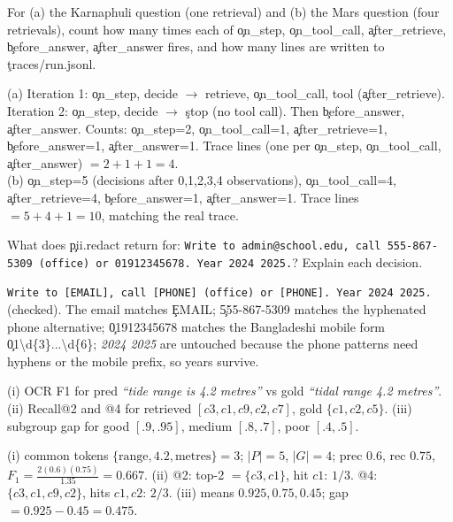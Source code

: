 \begin{problem}
For (a) the Karnaphuli question (one retrieval) and (b) the Mars question (four retrievals), count how many times each of \c{on\_step}, \c{on\_tool\_call}, \c{after\_retrieve}, \c{before\_answer}, \c{after\_answer} fires, and how many lines are written to \c{traces/run.jsonl}.
\end{problem}
\begin{solution}
(a) Iteration 1: \c{on\_step}, decide $\to$ retrieve, \c{on\_tool\_call}, tool (\c{after\_retrieve}). Iteration 2: \c{on\_step}, decide $\to$ \c{stop} (no tool call). Then \c{before\_answer}, \c{after\_answer}. Counts: \c{on\_step}=2, \c{on\_tool\_call}=1, \c{after\_retrieve}=1, \c{before\_answer}=1, \c{after\_answer}=1. Trace lines (one per \c{on\_step}, \c{on\_tool\_call}, \c{after\_answer}) $=2+1+1=4$.\\
(b) \c{on\_step}=5 (decisions after 0,1,2,3,4 observations), \c{on\_tool\_call}=4, \c{after\_retrieve}=4, \c{before\_answer}=1, \c{after\_answer}=1. Trace lines $=5+4+1=10$, matching the real trace.
\end{solution}

\begin{problem}[PII]
What does \c{pii.redact} return for: \texttt{Write to admin@school.edu, call 555-867-5309 (office) or 01912345678. Year 2024 2025.}? Explain each decision.
\end{problem}
\begin{solution}
\texttt{Write to [EMAIL], call [PHONE] (office) or [PHONE]. Year 2024 2025.} (checked). The email matches \c{EMAIL}; \c{555-867-5309} matches the hyphenated phone alternative; \c{01912345678} matches the Bangladeshi mobile form \c{01\textbackslash d\{3\}...\textbackslash d\{6\}}; \emph{2024 2025} are untouched because the phone patterns need hyphens or the mobile prefix, so years survive.
\end{solution}

\begin{problem}[Metrics]
(i) OCR F1 for pred \emph{``tide range is 4.2 metres''} vs gold \emph{``tidal range 4.2 metres''}. (ii) Recall@2 and @4 for retrieved $[c3,c1,c9,c2,c7]$, gold $\{c1,c2,c5\}$. (iii) subgroup gap for good $[.9,.95]$, medium $[.8,.7]$, poor $[.4,.5]$.
\end{problem}
\begin{solution}
(i) common tokens $\{\text{range},4.2,\text{metres}\}=3$; $|P|=5$, $|G|=4$; prec $0.6$, rec $0.75$, $F_1=\frac{2(0.6)(0.75)}{1.35}=0.667$. (ii) @2: top-2 $=\{c3,c1\}$, hit $c1$: $1/3$. @4: $\{c3,c1,c9,c2\}$, hits $c1,c2$: $2/3$. (iii) means $0.925,0.75,0.45$; gap $=0.925-0.45=0.475$.
\end{solution}

